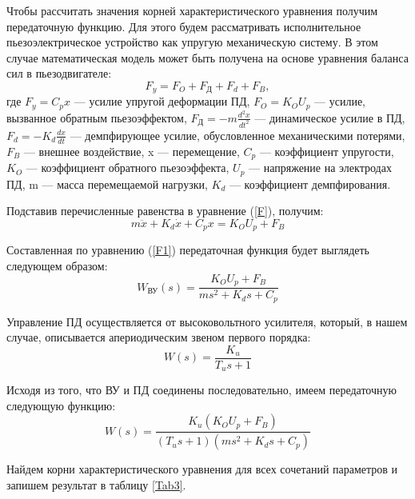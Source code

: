 \documentclass[12pt,a4paper]{article}
\begin{document}
Чтобы рассчитать значения корней характеристического уравнения получим передаточную функцию. Для этого будем рассматривать исполнительное пьезоэлектрическое устройство как упругую механическую систему. В этом случае математическая модель может быть получена на основе уравнения баланса сил в пьезодвигателе:  
\begin{equation} 
    F_y = F_O + F_\text{Д} + F_d + F_B,
    \label{F}
\end{equation}
где $F_y=C_px$ --- усилие упругой деформации ПД, $F_O=K_OU_p$ --- усилие, вызванное обратным пьезоэффектом, $F_\text{Д}=-m\displaystyle{\frac{d^2x}{dt^2}}$ --- динамическое усилие в ПД, $F_d=-K_d\displaystyle{\frac{dx}{dt}}$ --- демпфирующее усилие, обусловленное механическими потерями, $F_B$ --- внешнее воздействие, x --- перемещение, $C_p$ --- коэффициент упругости, $K_O$ --- коэффициент обратного пьезоэффекта, $U_p$ --- напряжение на электродах ПД, m --- масса перемещаемой нагрузки, $K_d$ --- коэффициент демпфирования.\par
Подставив перечисленные равенства в уравнение (\ref{F}), получим:
\begin{equation} 
    m\ddot{x} + K_d\dot{x} + C_px = K_OU_p + F_B
    \label{F1}
\end{equation}
\par Составленная по уравнению (\ref{F1}) передаточная функция будет выглядеть следующем образом:
\begin{equation} 
    W_{\text{ВУ}}(s)=\frac{K_OU_p + F_B}{ms^2 + K_ds + C_p}
    \label{FVU}
\end{equation}
\par Управление ПД осуществляется от высоковольтного усилителя, который, в нашем случае, описывается апериодическим звеном первого порядка:
\begin{equation} 
    W(s)=\frac{K_u}{T_us + 1}
\end{equation}
\par Исходя из того, что ВУ и ПД соединены последовательно, имеем передаточную следующую функцию:
\begin{equation} 
    W(s)=\frac{K_u(K_OU_p + F_B)}{(T_us + 1)(ms^2 + K_ds + C_p)}
\end{equation}
\par Найдем корни характеристического уравнения для всех сочетаний параметров и запишем результат в таблицу \ref{Tab3}.

\newpage
\end{document}

